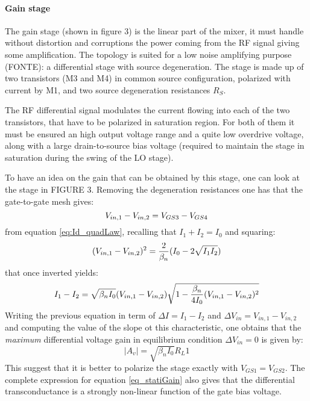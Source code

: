 \paragraph{Gain stage}

The gain stage (shown in figure 3) is the linear part of the mixer, it must handle without distortion and corruptions the power coming from the RF signal giving some amplification. The topology is suited for a low noise amplifying purpose (FONTE): a differential stage with source degeneration. The stage is made up of two transistors (M3 and M4) in common source configuration, polarized with current by M1, and two source degeneration resistances $R_S$.

The RF differential signal modulates the current flowing into each of the two transistors, that have to be polarized in saturation region. For both of them it must be ensured an high output voltage range and a quite low overdrive voltage, along with a large drain-to-source bias voltage (required to maintain the stage in saturation during the swing of the LO stage).

To have an idea on the gain that can be obtained by this stage, one can look at the stage in FIGURE 3. Removing the degeneration resistances one has that the gate-to-gate mesh gives:
\begin{equation}
V_{in,1}-V_{in,2} = V_{GS3}-V_{GS4} \notag
\end{equation} 
from equation \ref{eq:Id_quadLaw}, recalling that $I_{1}+I_{2}=I_0$ and squaring:
\begin{equation}
(V_{in,1}-V_{in,2})^2 = \frac{2}{\beta_n}(I_0-2\sqrt{I_1 I_2}) \notag
\end{equation}
that once inverted yields:
\begin{equation}
I_{1}-I_{2} = \sqrt{\beta_n I_0}(V_{in,1}-V_{in,2})\sqrt{1-\frac{\beta_n}{4I_0}(V_{in,1}-V_{in,2})^2} \notag
\end{equation}
Writing the previous equation in term of $\Delta I =I_{1}-I_{2} $ and $\Delta V_{in} = V_{in,1}-V_{in,2}$ and computing the value of the slope ot this characteristic, one obtains that the \emph{maximum} differential voltage gain in equilibrium condition $\Delta V_{in} =0$ is given by:
\begin{equation}
\label{eq_statiGain}
|A_{v}|= \sqrt{\beta_{n}I_0}R_L1
\end{equation}
This suggest that it is better to polarize the stage exactly with  $V_{GS1}=V_{GS2}$. The complete expression for equation \ref{eq_statiGain} also gives that the differential transconductance is a strongly non-linear function of the gate bias voltage. 

